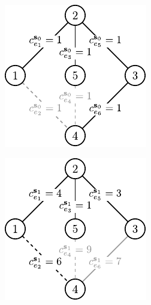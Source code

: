 \begin{figure}[!htbp]
{	}
\end{figure}

\begin{figure}[!htbp]
	\null\hfill
	\ContinuedFloat
	\begin{subfigure}[b]{0.3\textwidth}
		\includegraphics[width=\textwidth]{Chapter_II/ROB-INC-MST-example/a2}
		\caption{}
		\label{fig:robincrexample:d}
	\end{subfigure}
	\hfill
	\begin{subfigure}[b]{0.3\textwidth}
		\includegraphics[width=\textwidth]{Chapter_II/ROB-INC-MST-example/b2}

\end{subfigure}
\end{figure}
